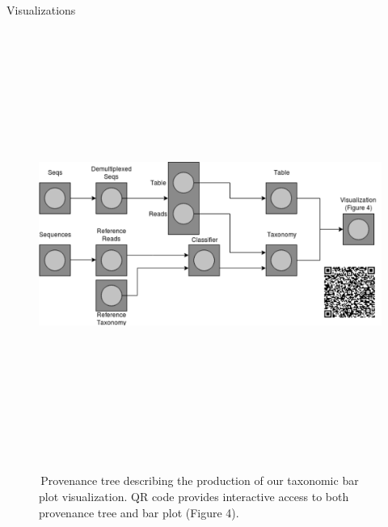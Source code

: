 \documentclass[final]{beamer}
\newlength{\colwidth}
\begin{document}
\begin{frame}[t]
\begin{columns}[t]
\begin{column}{\colwidth}
  \begin{block}{Visualizations}
    \begin{figure}[tph!]
      {\includegraphics[height=14cm]{assets/provenance}}
      \caption{\,Provenance tree describing the production of our taxonomic bar plot visualization. QR code provides interactive access to both provenance tree and bar plot (Figure 4).}
      \label{fig:provenance}
    \end{figure}


\end{block}
\end{column}
\end{columns}
\end{frame}
\end{document}
